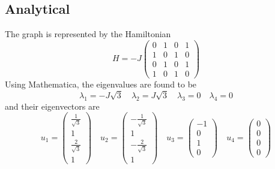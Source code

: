 \documentclass[aps]{revtex4-2}
\begin{document}
\subsection{Analytical}
\noindent The graph is represented by the Hamiltonian
\begin{equation}
    H=-J\begin{pmatrix}
        0&1&0&1\\
        1&0&1&0\\
        0&1&0&1\\
        1&0&1&0
    \end{pmatrix}
\end{equation}
Using Mathematica, the eigenvalues are found to be
\begin{equation}
    \lambda_1=-J\sqrt{3}\quad\lambda_2=J\sqrt{3}\quad\lambda_3=0\quad\lambda_4=0
\end{equation}
and their eigenvectors are
\begin{equation}
    u_1=\begin{pmatrix}
        \frac{1}{\sqrt{3}}\\
        1\\
        \frac{2}{\sqrt{3}}\\
        1
    \end{pmatrix}\quad u_2=\begin{pmatrix}
        -\frac{1}{\sqrt{3}}\\
        1\\
        -\frac{2}{\sqrt{3}}\\
        1
    \end{pmatrix}\quad u_3=\begin{pmatrix}
        -1\\
        0\\
        1\\
        0
    \end{pmatrix}\quad u_4=\begin{pmatrix}
        0\\
        0\\
        0\\
        0
    \end{pmatrix}
\end{equation}
\end{document}
